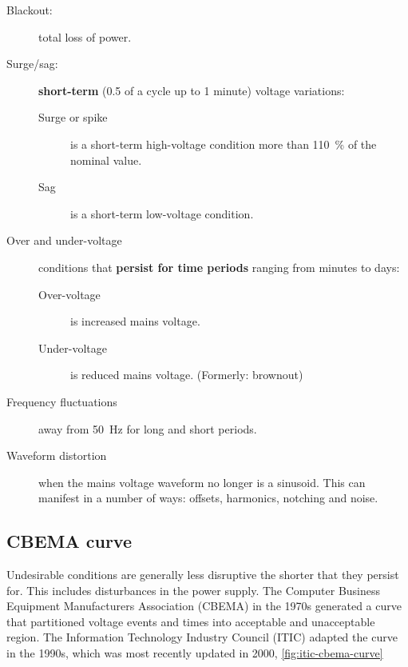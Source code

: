 \documentclass{pgnotes}
\begin{document}
\begin{description}
\item[Blackout:] total loss of power.
\item[Surge/sag:] \textbf{short-term} (0.5 of a cycle up to 1 minute) voltage variations:
\begin{description}
\item[Surge or spike] is a short-term high-voltage condition more than \SI{110}{\percent} of the nominal value.
\item[Sag] is a short-term low-voltage condition.
\end{description}

\item[Over and under-voltage] conditions that \textbf{persist for time periods} ranging from minutes to days:
\begin{description}
\item[Over-voltage] is increased mains voltage.
\item[Under-voltage] is reduced mains voltage.  (Formerly: brownout)
\end{description}

\item[Frequency fluctuations] away from \SI{50}{\hertz} for long and short periods.

\item[Waveform distortion] when the mains voltage waveform no longer is a sinusoid.
This can manifest in a number of ways: offsets, harmonics, notching and noise.

\end{description}

\newpage

\subsection{CBEMA curve}

Undesirable conditions are generally less disruptive the shorter that they persist for.
This includes disturbances in the power supply.
The Computer Business Equipment Manufacturers Association (CBEMA) in the 1970s generated a curve that partitioned voltage events and times into acceptable and unacceptable region.
The Information Technology Industry Council (ITIC) adapted the curve in the 1990s, which was most recently updated in 2000, \autoref{fig:itic-cbema-curve}
\end{document}
